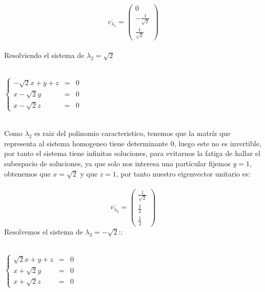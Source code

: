 \documentclass[11pt,letterpaper]{article}
\begin{document}
    \begin{equation*}
        \overline{v_{\lambda_1}}=  
        \begin{pmatrix}
                0 \\
                -\frac{1}{\sqrt{2}}\\
                \frac{1}{\sqrt{2}}
                \end{pmatrix}
    \end{equation*}\,\\
    Resolviendo el sistema de $\lambda_2=\sqrt{2}$\,\\
    \,\\
     \begin{center}
     $\left\{ 
         \begin{array}{rcl}
            -\sqrt{2}x+y+z&=&0\\
            x-\sqrt{2}y&=&0\\
            x-\sqrt{2}z&=&0
         \end{array}
       \right.$\,\\
        \end{center}
    \,\\
    Como $\lambda_2$ es raiz del polinomio caracteristico, tenemos que la matr\'iz
    que representa al sistema homogeneo tiene determinante $0$, luego este no es invertible, por tanto
    el sistema tiene infinitas soluciones, para evitarnos la fatiga de hallar el subespacio de soluciones, ya que 
    solo nos interesa una part\'icular fijemos $y=1$, obtenemos que $x=\sqrt{2}$ y que $z=1$, por tanto
    nuestro eigenvector unitario es:\,\\
    \,\\
   \begin{equation*}
    \overline{v_{\lambda_2}}=\begin{pmatrix}
                \frac{1}{\sqrt{2}}\\
                \frac{1}{2}\\
                \frac{1}{2}
                \end{pmatrix}
   \end{equation*}
    Resolvemos el sistema de $\lambda_3=-\sqrt{2}$::\,\\
    \,\\
     \begin{center}
     $\left\{ 
         \begin{array}{rcl}
            \sqrt{2}x+y+z&=&0\\
            x+\sqrt{2}y&=&0\\
            x+\sqrt{2}z&=&0
         \end{array}
       \right.$\,\\
        \end{center}\,\\
\end{document}
